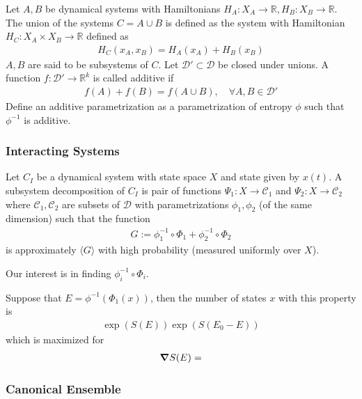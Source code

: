 \documentclass{article}
\begin{document}
Let $A, B$ be dynamical systems with Hamiltonians $H_A: X_A \to \mathbb{R}, H_B: X_B \to \mathbb{R}$.
The union of the systems $C = A \cup B$ is defined as the system with Hamiltonian $H_C: X_A \times X_B \to \mathbb{R}$ defined as
\begin{align*}
    H_C(x_A, x_B) = H_A(x_A) + H_B(x_B)
\end{align*}
$A, B$ are said to be subsystems of $C$. Let $\mathcal{D}' \subset \mathcal{D}$ be closed under unions.
A function $f: \mathcal{D}' \to \mathbb{R}^k$ is called additive if
\begin{align*}
    f(A) + f(B) = f(A \cup B),\quad \forall A, B \in \mathcal{D}'
\end{align*}
Define an additive parametrization as a parametrization of entropy $\phi$ such that $\phi^{-1}$ is additive.

\subsubsection{Interacting Systems}

Let $C_I$ be a dynamical system with state space $X$ and state given by $x(t)$.
A subsystem decomposition of $C_I$ is pair of functions $\Psi_1: X \to \mathcal{C}_1$ and $\Psi_2: X \to \mathcal{C}_2$
where $\mathcal{C}_1, \mathcal{C}_2$ are subsets of $\mathcal{D}$ with parametrizations $\phi_1, \phi_2$ (of the same dimension) such that
the function
\begin{align*}
    G := \phi_1^{-1} \circ \Phi_1 + \phi_2^{-1} \circ \Phi_2
\end{align*}
is approximately $\langle G \rangle$ with high probability (measured uniformly over $X$).

Our interest is in finding $\phi_i^{-1} \circ \Phi_i$.

Suppose that $E = \phi^{-1}(\Phi_1(x))$, then the number of states $x$ with this property is
\begin{align*}
    \exp(S(E))\exp(S(E_0 - E))
\end{align*}
which is maximized for
\begin{align*}
    \grad S(E) = 
\end{align*}

\subsubsection{Canonical Ensemble}

\end{document}
